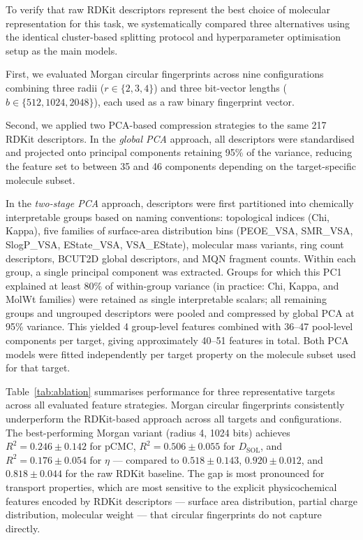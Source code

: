 \documentclass[11pt]{aime}
\begin{document}
To verify that raw RDKit descriptors represent the best choice of molecular representation for this task, we systematically compared three alternatives using the identical cluster-based splitting protocol and hyperparameter optimisation setup as the main models.

First, we evaluated Morgan circular fingerprints across nine configurations combining three radii ($r \in \{2, 3, 4\}$) and three bit-vector lengths ($b \in \{512, 1024, 2048\}$), each used as a raw binary fingerprint vector.

Second, we applied two PCA-based compression strategies to the same 217 RDKit descriptors.
In the \emph{global PCA} approach, all descriptors were standardised and projected onto principal components retaining 95\% of the variance, reducing the feature set to between 35 and 46 components depending on the target-specific molecule subset.

In the \emph{two-stage PCA} approach, descriptors were first partitioned into chemically interpretable groups based on naming conventions: topological indices (Chi, Kappa), five families of surface-area distribution bins (PEOE\_VSA, SMR\_VSA, SlogP\_VSA, EState\_VSA, VSA\_EState), molecular mass variants, ring count descriptors, BCUT2D global descriptors, and MQN fragment counts.
Within each group, a single principal component was extracted.
Groups for which this PC1 explained at least 80\% of within-group variance (in practice: Chi, Kappa, and MolWt families) were retained as single interpretable scalars;
all remaining groups and ungrouped descriptors were pooled and compressed by global PCA at 95\% variance.
This yielded 4 group-level features combined with 36--47 pool-level components per target, giving approximately 40--51 features in total.
Both PCA models were fitted independently per target property on the molecule subset used for that target.

Table~\ref{tab:ablation} summarises performance for three representative targets across all evaluated feature strategies.
Morgan circular fingerprints consistently underperform the RDKit-based approach across all targets and configurations.
The best-performing Morgan variant (radius 4, 1024 bits) achieves $R^2 = 0.246 \pm 0.142$ for pCMC, $R^2 = 0.506 \pm 0.055$ for $D_{\mathrm{SOL}}$, and $R^2 = 0.176 \pm 0.054$ for $\eta$ --- compared to $0.518 \pm 0.143$, $0.920 \pm 0.012$, and $0.818 \pm 0.044$ for the raw RDKit baseline.
The gap is most pronounced for transport properties, which are most sensitive to the explicit physicochemical features encoded by RDKit descriptors --- surface area distribution, partial charge distribution, molecular weight --- that circular fingerprints do not capture directly.
\end{document}
